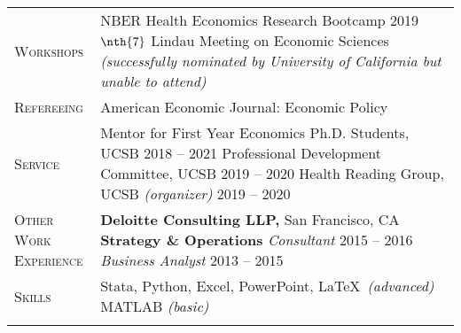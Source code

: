 \documentclass[11pt]{article}
\begin{document}
\begin{tabularx}{\textwidth}{@{}Y Z@{}}
	\textsc{Workshops} & 
	NBER Health Economics Research Bootcamp \hfill 2019%
	\vspace{6pt} \newline
	$\nth{7}$ Lindau Meeting on Economic Sciences \newline \textit{(successfully nominated by University of California but unable to attend)} 
	\\ \addlinespace[20pt] 
	
	\textsc{Refereeing}  & 
	American Economic Journal: Economic Policy
	 \\ \addlinespace[20pt] 
	
	\textsc{Service} & 
	Mentor for First Year Economics Ph.D. Students, UCSB \hfill 2018 -- 2021%
	\vspace{3pt} \newline
	Professional Development Committee, UCSB \hfill 2019 -- 2020%
	\vspace{3pt} \newline
	Health Reading Group, UCSB \textit{(organizer)} \hfill 2019 -- 2020%
	\\ \addlinespace[20pt] 
	

	\textsc{Other Work \newline Experience}  & 
	\textbf{Deloitte Consulting LLP,} San Francisco, CA
	\vspace{0pt} \newline
	\textbf{Strategy \& Operations} 
	\vspace{3pt} \newline
	\textit{Consultant} \hfill 2015 -- 2016%
	\vspace{0pt} \newline
	\textit{Business Analyst} \hfill 2013 -- 2015%
	\\ \addlinespace[20pt] 
	
	\textsc{Skills}  & 
	Stata, Python, Excel, PowerPoint, \LaTeX \ \textit{(advanced)}
	\vspace{3pt} \newline
	MATLAB \textit{(basic)}
	\\ \newpage
	

\end{tabularx}
\end{document}
